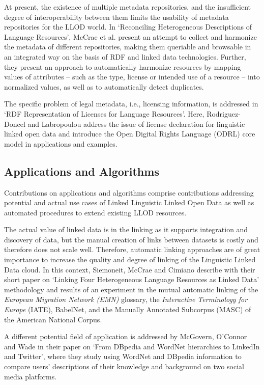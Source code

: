 At present, the existence of multiple metadata repositories, and the insufficient degree of interoperability between them limits the usability of metadata repositories for the LLOD world. 
In `Reconciling Heterogeneous Descriptions of Language Resources', McCrae et al. present an attempt to collect and harmonize the metadata of different repositories, making them queriable and browsable in an integrated way on the basis of RDF and linked data technologies. Further, they present an approach to automatically harmonize resources by mapping values of attributes -- such as the type, license or intended use of a resource -- into normalized values, as well as to automatically detect duplicates.

The specific problem of legal metadata, i.e., licensing information, is addressed in `RDF Representation of Licenses for Language Resources'. 
Here, Rodriguez-Doncel and Labropoulou address the issue of license declaration for linguistic linked open data and introduce the Open Digital Rights Language (ODRL) core model in applications and examples.

\subsection{Applications and Algorithms}

Contributions on applications and algorithms comprise contributions addressing potential and actual use cases of Linked Linguistic Linked Open Data as well as automated procedures to extend existing LLOD resources.

The actual value of linked data is in the linking as it supports integration and discovery of data, but the manual creation of links between datasets is costly and therefore does not scale well. Therefore, automatic linking approaches are of great importance to increase the quality and degree of linking of the Linguistic Linked Data cloud.
In this context, Siemoneit, McCrae and Cimiano describe with their short paper on `Linking Four Heterogeneous Language Resources as Linked Data' methodology and results of an experiment in the mutual automatic linking of the \emph{European Migration Network (EMN)} glossary, the \emph{Interactive Terminology for Europe} (IATE), BabelNet, and the Manually Annotated Subcorpus (MASC) of the American National Corpus.

A different potential field of application is addressed by McGovern, O'Connor and Wade in their paper on `From DBpedia and WordNet hierarchies to LinkedIn and Twitter', where they study using WordNet and DBpedia information to compare users' descriptions of their knowledge and background on two social media platforms.

